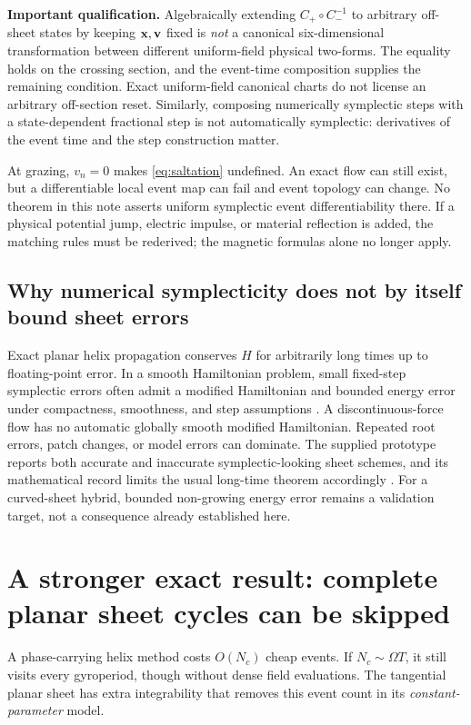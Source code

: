 \documentclass[10pt,a4paper]{article}
\begin{document}
\textbf{Important qualification.} Algebraically extending $C_+\circ C_-^{-1}$ to arbitrary off-sheet states by keeping $\mathbf x,\mathbf v$ fixed is \emph{not} a canonical six-dimensional transformation between different uniform-field physical two-forms. The equality holds on the crossing section, and the event-time composition supplies the remaining condition. Exact uniform-field canonical charts do not license an arbitrary off-section reset. Similarly, composing numerically symplectic steps with a state-dependent fractional step is not automatically symplectic: derivatives of the event time and the step construction matter.

At grazing, $v_n=0$ makes \eqref{eq:saltation} undefined. An exact flow can still exist, but a differentiable local event map can fail and event topology can change. No theorem in this note asserts uniform symplectic event differentiability there. If a physical potential jump, electric impulse, or material reflection is added, the matching rules must be rederived; the magnetic formulas alone no longer apply.

\subsection{Why numerical symplecticity does not by itself bound sheet errors}
Exact planar helix propagation conserves $H$ for arbitrarily long times up to floating-point error. In a smooth Hamiltonian problem, small fixed-step symplectic errors often admit a modified Hamiltonian and bounded energy error under compactness, smoothness, and step assumptions \cite{gni}. A discontinuous-force flow has no automatic globally smooth modified Hamiltonian. Repeated root errors, patch changes, or model errors can dominate. The supplied prototype reports both accurate and inaccurate symplectic-looking sheet schemes, and its mathematical record limits the usual long-time theorem accordingly \cite{rejected,sheetreadme}. For a curved-sheet hybrid, bounded non-growing energy error remains a validation target, not a consequence already established here.

\section{A stronger exact result: complete planar sheet cycles can be skipped}
\label{sec:cycle}
A phase-carrying helix method costs $O(N_c)$ cheap events. If $N_c\sim\Omega T$, it still visits every gyroperiod, though without dense field evaluations. The tangential planar sheet has extra integrability that removes this event count in its \emph{constant-parameter} model.
\end{document}
